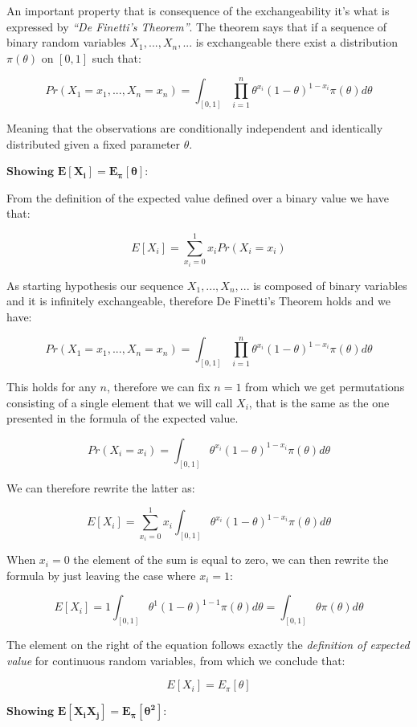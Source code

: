\documentclass[
]{article}
\begin{document}
An important property that is consequence of the exchangeability it's
what is expressed by \emph{``De Finetti's Theorem''}. The theorem says
that if a sequence of binary random variables \(X_1,...,X_n,...\) is
exchangeable there exist a distribution \(\pi(\theta)\) on \([0,1]\)
such that:

\[
Pr(X_1=x_1,...,X_n=x_n) = 
\int_{[0,1]} \prod_{i=1}^n\theta^{x_i}(1 - \theta)^{1 - x_i} \pi(\theta)d\theta
\]

Meaning that the observations are conditionally independent and
identically distributed given a fixed parameter \(\theta\).

\(\textbf{Showing } \mathbf{E[X_i]=E_{\pi}[\theta]}\):

From the definition of the expected value defined over a binary value we
have that:

\[
E[X_i] = \sum_{x_i=0}^1x_iPr(X_i=x_i)
\]

As starting hypothesis our sequence \(X_1,...,X_n,...\) is composed of
binary variables and it is infinitely exchangeable, therefore De
Finetti's Theorem holds and we have:

\[
Pr(X_1=x_1,...,X_n=x_n) = 
\int_{[0,1]} \prod_{i=1}^n\theta^{x_i}(1 - \theta)^{1 - x_i} \pi(\theta)d\theta
\]

This holds for any \(n\), therefore we can fix \(n = 1\) from which we
get permutations consisting of a single element that we will call
\(X_i\), that is the same as the one presented in the formula of the
expected value.

\[
Pr(X_i=x_i) = 
\int_{[0,1]} \theta^{x_i}(1 - \theta)^{1 - x_i} \pi(\theta)d\theta
\]

We can therefore rewrite the latter as:

\[
E[X_i] = 
\sum_{x_i=0}^1x_i\int_{[0,1]} \theta^{x_i}(1 - \theta)^{1 - x_i} \pi(\theta)d\theta
\]

When \(x_i = 0\) the element of the sum is equal to zero, we can then
rewrite the formula by just leaving the case where \(x_i = 1\):

\[
E[X_i] = 1\int_{[0,1]} \theta^{1}(1 - \theta)^{1 - 1} \pi(\theta)d\theta =
\int_{[0,1]} \theta \pi(\theta)d\theta
\]

The element on the right of the equation follows exactly the
\emph{definition of expected value} for continuous random variables,
from which we conclude that:

\[
E[X_i] = E_\pi[\theta]
\]

\(\textbf{Showing } \mathbf{E[X_iX_j]=E_{\pi}[\theta^2]}\):
\end{document}
